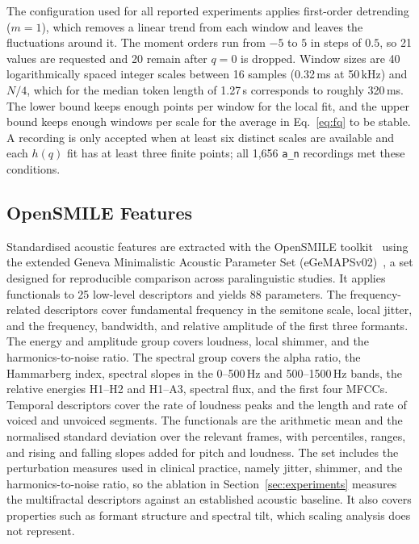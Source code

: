 \documentclass[runningheads]{llncs}
\begin{document}
  The configuration used for all reported experiments applies first-order detrending ($m = 1$), which removes a linear trend from each window and leaves the fluctuations around it. The moment orders run from $-5$ to $5$ in steps of $0.5$, so 21 values are requested and 20 remain after $q = 0$ is dropped. Window sizes are 40 logarithmically spaced integer scales between 16 samples (0.32\,ms at 50\,kHz) and $N/4$, which for the median token length of 1.27\,s corresponds to roughly 320\,ms. The lower bound keeps enough points per window for the local fit, and the upper bound keeps enough windows per scale for the average in Eq.~\eqref{eq:fq} to be stable. A recording is only accepted when at least six distinct scales are available and each $h(q)$ fit has at least three finite points; all 1,656 \texttt{a\_n} recordings met these conditions.

  \subsection{OpenSMILE Features}

  Standardised acoustic features are extracted with the OpenSMILE toolkit~\cite{eyben2010} using the extended Geneva Minimalistic Acoustic Parameter Set (eGeMAPSv02)~\cite{opensmile}, a set designed for reproducible comparison across paralinguistic studies. It applies functionals to 25 low-level descriptors and yields 88 parameters. The frequency-related descriptors cover fundamental frequency in the semitone scale, local jitter, and the frequency, bandwidth, and relative amplitude of the first three formants. The energy and amplitude group covers loudness, local shimmer, and the harmonics-to-noise ratio. The spectral group covers the alpha ratio, the Hammarberg index, spectral slopes in the 0--500\,Hz and 500--1500\,Hz bands, the relative energies H1--H2 and H1--A3, spectral flux, and the first four MFCCs. Temporal descriptors cover the rate of loudness peaks and the length and rate of voiced and unvoiced segments. The functionals are the arithmetic mean and the normalised standard deviation over the relevant frames, with percentiles, ranges, and rising and falling slopes added for pitch and loudness. The set includes the perturbation measures used in clinical practice, namely jitter, shimmer, and the harmonics-to-noise ratio, so the ablation in Section~\ref{sec:experiments} measures the multifractal descriptors against an established acoustic baseline. It also covers properties such as formant structure and spectral tilt, which scaling analysis does not represent.
\end{document}
